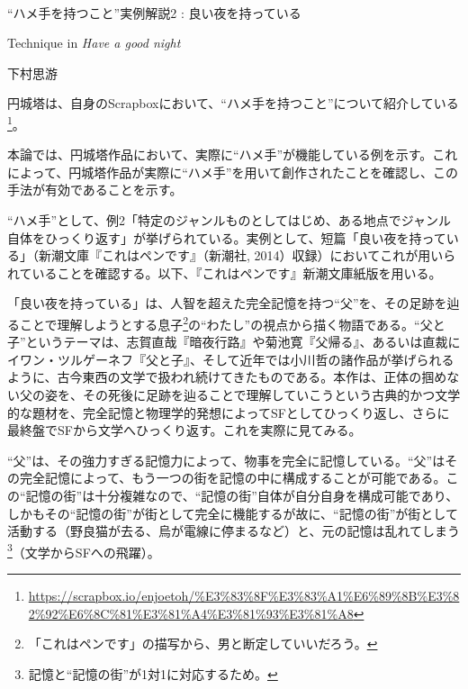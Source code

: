 \documentclass[10pt, a5paper, twoside]{jsarticle}
\theoremstyle{definition}
\begin{document}
	~ %

	\begin{center}

		\Large{“ハメ手を持つこと”実例解説2 : 良い夜を持っている}

		\vspace{3mm}

		\large{Technique in \textit{Have a good night}}

		\vspace{3mm}
		
		\large{下村思游}

	\end{center}

	\vspace{3mm}

		円城塔は、自身のScrapboxにおいて、“ハメ手を持つこと”について紹介している\footnote{\url{https://scrapbox.io/enjoetoh/%E3%83%8F%E3%83%A1%E6%89%8B%E3%82%92%E6%8C%81%E3%81%A4%E3%81%93%E3%81%A8}}。

		本論では、円城塔作品において、実際に“ハメ手”が機能している例を示す。これによって、円城塔作品が実際に“ハメ手”を用いて創作されたことを確認し、この手法が有効であることを示す。

		“ハメ手”として、例2「特定のジャンルものとしてはじめ、ある地点でジャンル自体をひっくり返す」が挙げられている。実例として、短篇「良い夜を持っている」（新潮文庫『これはペンです』（新潮社, 2014）収録）においてこれが用いられていることを確認する。以下、『これはペンです』新潮文庫紙版を用いる。

		「良い夜を持っている」は、人智を超えた完全記憶を持つ“父”を、その足跡を辿ることで理解しようとする息子\footnote{「これはペンです」の描写から、男と断定していいだろう。}の“わたし”の視点から描く物語である。“父と子”というテーマは、志賀直哉『暗夜行路』や菊池寛『父帰る』、あるいは直裁にイワン・ツルゲーネフ『父と子』、そして近年では小川哲の諸作品が挙げられるように、古今東西の文学で扱われ続けてきたものである。本作は、正体の掴めない父の姿を、その死後に足跡を辿ることで理解していこうという古典的かつ文学的な題材を、完全記憶と物理学的発想によってSFとしてひっくり返し、さらに最終盤でSFから文学へひっくり返す。これを実際に見てみる。

		“父”は、その強力すぎる記憶力によって、物事を完全に記憶している。“父”はその完全記憶によって、もう一つの街を記憶の中に構成することが可能である。この“記憶の街”は十分複雑なので、“記憶の街”自体が自分自身を構成可能であり、しかもその“記憶の街”が街として完全に機能するが故に、“記憶の街”が街として活動する（野良猫が去る、烏が電線に停まるなど）と、元の記憶は乱れてしまう\footnote{記憶と“記憶の街”が1対1に対応するため。}（文学からSFへの飛躍）。
\end{document}
